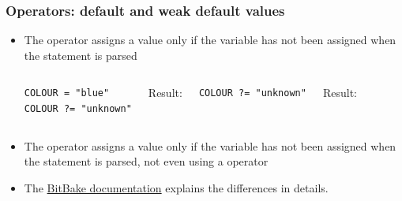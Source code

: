 \begin{frame}[fragile]
  \frametitle{Operators: default and weak default values}
  \begin{itemize}
  \item The  operator assigns a value only if the variable has not
    been assigned when the statement is parsed
  \begin{columns}
    \begin{block}{}
      \begin{verbatim}
COLOUR = "blue"
COLOUR ?= "unknown"
      \end{verbatim}
    \end{block}
    Result: 
    \break
    \begin{block}{}
      \begin{verbatim}
COLOUR ?= "unknown"
      \end{verbatim}
    \end{block}
     Result: 
    \break
  \end{columns}
  \item The  operator assigns a value only if the variable has
    not been assigned when the statement is parsed, not even using a
     operator
  \item The \href{https://docs.yoctoproject.org/bitbake/bitbake-user-manual/bitbake-user-manual-metadata.html#setting-a-default-value}{BitBake documentation}
    explains the differences in details.
  \end{itemize}
\end{frame}

